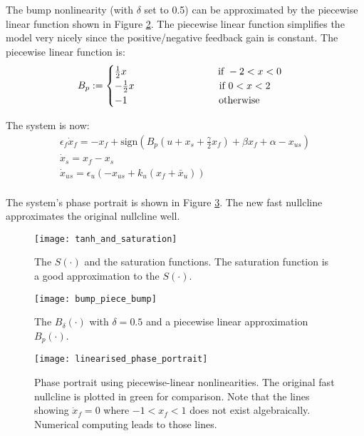 \documentclass[a4paper, 12pt]{article}
\begin{document}
The bump nonlinearity (with $\delta$ set to 0.5) can be approximated by the piecewise linear function shown in Figure \ref{fig:bump_linear}. The piecewise linear function simplifies the model very nicely since the positive/negative feedback gain is constant. The piecewise linear function is:
\begin{equation}
B_p:= \begin{cases}
\frac{1}{2}x \text{ \hspace{3cm}  if } -2<x<0 \\
-\frac{1}{2}x \text{\hspace{3cm}if } 0<x<2 \\
-1 \text{ \hspace{3cm}  otherwise}
\end{cases}
\end{equation}

The system is now: 
\begin{equation}
\begin{array}{l}
\displaystyle \epsilon_f\dot{x}_{f} = -x_f + \text{sign}\left(B_p\left(u + x_s + \tfrac{\gamma}{2}x_f\right) + \beta x_f + \alpha  - x_{us}  \right)\\
\displaystyle \dot{x}_{s} = x_f - x_s \\
\displaystyle \dot{x}_{us} = \epsilon_u\left(-x_{us} + k_u(x_f+\bar{x}_u) \right)\\
\end{array}
\label{eq:restSpikeBistability2}
\end{equation}

The system's phase portrait is shown in Figure \ref{fig:linearised_phase_portrait}. The new fast nullcline approximates the original nullcline well. 

\begin{figure}[p]
\texttt{[image: tanh\_and\_saturation]}
\caption{The $S(\cdot)$ and the saturation functions. The saturation function is a good approximation to the $S(\cdot)$. }
\label{fig:sigmoid_linear}
\end{figure}

\begin{figure}[p]
\texttt{[image: bump\_piece\_bump]}
\caption{The $B_\delta(\cdot)$ with $\delta = 0.5$ and a piecewise linear approximation $B_p(\cdot)$.}
\label{fig:bump_linear}
\end{figure}


\begin{figure}[p]
\texttt{[image: linearised\_phase\_portrait]}
\caption{Phase portrait using piecewise-linear nonlinearities. The original fast nullcline is plotted in green for comparison. Note that the lines showing $\dot{x}_f=0$ where $-1<x_f<1$ does not exist algebraically. Numerical computing leads to those lines.}
\label{fig:linearised_phase_portrait}
\end{figure}
\end{document}
